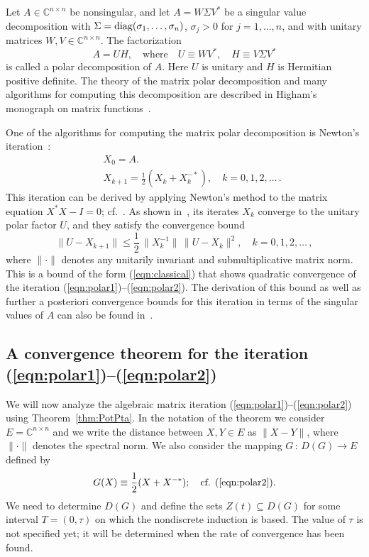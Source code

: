 \documentclass{siamltex}
\begin{document}
Let $A\in {\mathbb C}^{n\times n}$ be nonsingular, and let $A=W\Sigma V^*$ be a singular value
decomposition with $\Sigma={\rm diag}(\sigma_1,\dots,\sigma_n)$, $\sigma_j>0$ for $j=1,\dots,n$,
and with unitary matrices $W,V\in {\mathbb C}^{n\times n}$. The factorization
$$A=UH,\quad\mbox{where}\quad U\equiv WV^*,\quad H\equiv V\Sigma V^*$$
is called a polar decomposition of $A$. Here $U$ is unitary and $H$ is Hermitian positive definite.
The theory of the matrix polar decomposition and many algorithms for computing this decomposition are
described in Higham's monograph on matrix functions~\cite[Chapter~8]{HigBook08}.

One of the algorithms for computing the matrix polar decomposition is Newton's
iteration~\cite[Equation (8.17)]{HigBook08}:
\begin{eqnarray}
& & X_0=A.\label{eqn:polar1}\\
& & X_{k+1} = \frac12 (X_k+X_k^{-*}),\quad k=0,1,2,\dots\,.\label{eqn:polar2}
\end{eqnarray}
This iteration can be derived by applying Newton's method to the matrix equation
$X^*X-I=0$; cf.~\cite[Problem~8.18]{HigBook08}. As shown in~\cite[Theorem~8.12]{HigBook08},
its iterates $X_k$ converge to the unitary polar factor $U$, and they satisfy the
convergence bound
$$\|U-X_{k+1}\|\leq \frac12\,\|X_k^{-1}\|\,\|U-X_k\|^2,\quad k=0,1,2,\dots\,,$$
where $\|\cdot\|$ denotes any unitarily invariant and submultiplicative matrix norm.
This is a bound of the form (\ref{eqn:classical}) that shows quadratic convergence of
the iteration (\ref{eqn:polar1})--(\ref{eqn:polar2}). The derivation of this bound
as well as further a posteriori convergence bounds for this iteration in terms of the
singular values of $A$ can also be found in~\cite[Theorem~3.1]{Hig86b}.

\subsection{A convergence theorem for the iteration (\ref{eqn:polar1})--(\ref{eqn:polar2})}
We will now analyze the algebraic matrix iteration (\ref{eqn:polar1})--(\ref{eqn:polar2})
using Theorem~\ref{thm:PotPta}. In the notation of the theorem we consider
$E={\mathbb C}^{n\times n}$ and we write the distance between $X,Y\in E$ as $\|X-Y\|$,
where $\|\cdot\|$ denotes the spectral norm. We also consider the mapping $G\,:\,D(G)\rightarrow E$
defined by
$$G(X)\equiv\frac12 (X+X^{-*});\quad\mbox{cf. (\ref{eqn:polar2}).}$$
We need to determine $D(G)$ and define the sets $Z(t)\subseteq D(G)$ for some
interval $T=(0,\tau)$ on which the nondiscrete induction is based. The value of $\tau$
is not specified yet; it will be determined when the rate of convergence
has been found.
\end{document}
